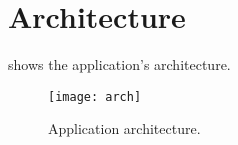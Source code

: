 \chapter{Architecture}\label{ch:arch}

 shows the application's architecture.

\begin{figure}[h]
	\centering
	\texttt{[image: arch]}
	\caption{Application architecture.}\label{fig:arch}
\end{figure}




